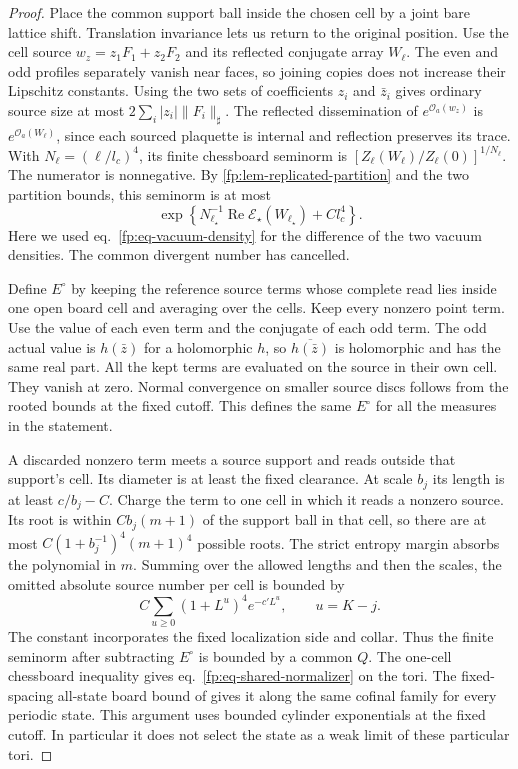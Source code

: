 \documentclass[11pt,letterpaper,reqno]{amsart}
\numberwithin{equation}{section}
\renewcommand{\eqref}[1]{\textup{eq.~\ref{#1}}}
\theoremstyle{definition}
\theoremstyle{remark}
\begin{document}
\begin{proof}
Place the common support ball inside the chosen cell by a
joint bare lattice shift. Translation invariance lets us
return to the original position. Use the cell source
$w_z=z_1F_1+z_2F_2$ and its reflected conjugate array $W_\ell$.
The even and odd profiles separately vanish near faces, so
joining copies does not increase their Lipschitz constants.
Using the two sets of coefficients $z_i$ and $\bar z_i$ gives
ordinary source size at most $2\sum_i|z_i|\|F_i\|_\sharp$.
The reflected dissemination of $e^{\mathcal O_a(w_z)}$
is $e^{\mathcal O_a(W_\ell)}$, since each sourced plaquette
is internal and reflection preserves its trace. With
$N_\ell=(\ell/l_c)^4$, its finite chessboard seminorm is
$[Z_\ell(W_\ell)/Z_\ell(0)]^{1/N_\ell}$. The numerator is
nonnegative. By \cref{fp:lem-replicated-partition} and the
two partition bounds, this seminorm is at most
\[
 \exp\left\{
 N_{\ell_\star}^{-1}\operatorname{Re}
     \mathcal E_\star(W_{\ell_\star})+C l_c^4
 \right\}.
\]
Here we used \eqref{fp:eq-vacuum-density} for the difference
of the two vacuum densities. The common divergent number
has cancelled.

Define $E^\circ$ by keeping the reference source terms whose
complete read lies inside one open board cell and averaging
over the cells. Keep every nonzero point term. Use the value
of each even term and the conjugate of each odd term. The
odd actual value is $h(\bar z)$ for a holomorphic $h$, so
$\overline{h(\bar z)}$ is holomorphic and has the same real
part. All the kept terms are evaluated on the source in
their own cell. They vanish at zero. Normal convergence
on smaller source discs follows from the rooted bounds
at the fixed cutoff. This defines the same $E^\circ$ for all
the measures in the statement.

A discarded nonzero term meets a source support and reads
outside that support's cell. Its diameter is at least
the fixed clearance. At scale $b_j$ its length is at least
$c/b_j-C$. Charge the term to one cell in which it reads a
nonzero source. Its root is within $C b_j(m+1)$ of the support
ball in that cell, so there are at most
$C(1+b_j^{-1})^4(m+1)^4$ possible roots. The strict entropy
margin absorbs the polynomial in $m$. Summing over the
allowed lengths and then the scales, the omitted absolute
source number per cell is bounded by
\[
 C\sum_{u\ge0}(1+L^u)^4 e^{-c'L^u},
 \qquad u=K-j.
\]
The constant incorporates the fixed localization side and collar. Thus the finite
seminorm after subtracting $E^\circ$ is bounded by a
common $Q$. The one-cell chessboard inequality gives
\eqref{fp:eq-shared-normalizer} on the tori. The fixed-spacing
all-state board bound of \cite[Theorem~C]{LP} gives it along
the same cofinal family for every periodic state. This
argument uses bounded cylinder exponentials at the fixed
cutoff. In particular it does not select the state as a
weak limit of these particular tori.
\end{proof}
\end{document}
